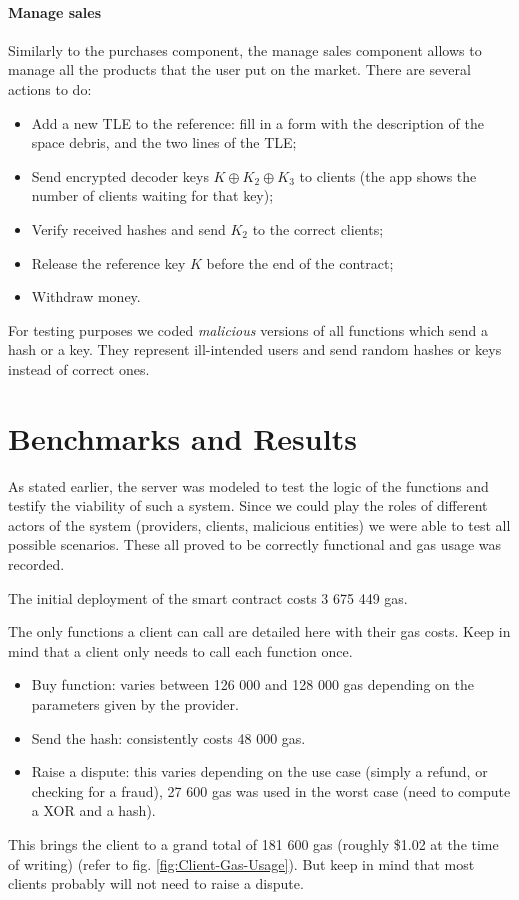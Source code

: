 \documentclass[conference]{IEEEtran}
\begin{document}
\paragraph{Manage sales}
Similarly to the purchases component, the manage sales component allows to manage all the products that the user put on the market. There are several actions to do:
 \begin{itemize}
    \item Add a new TLE to the reference: fill in a form with the description of the space debris, and the two lines of the TLE;
    \item Send encrypted decoder keys $K \oplus K_2 \oplus K_3$ to clients (the app shows the number of clients waiting for that key);
    \item Verify received hashes and send $K_2$ to the correct clients;
    \item Release the reference key $K$ before the end of the contract;
    \item Withdraw money.
\end{itemize}

For testing purposes we coded \textit{malicious} versions of all functions which send a hash or a key. They represent ill-intended users and send random hashes or keys instead of correct ones.

\section{Benchmarks and Results}{\label{Benchmarks}}

As stated earlier, the server was modeled to test the logic of the functions and testify the viability of such a system. Since we could play the roles of different actors of the system (providers, clients, malicious entities) we were able to test all possible scenarios. These all proved to be correctly functional and gas usage was recorded.

The initial deployment of the smart contract costs 3 675 449 gas.


The only functions a client can call are detailed here with their gas costs. Keep in mind that a client only needs to call each function once. 
\begin{itemize}
    \item Buy function: varies between 126 000 and 128 000 gas depending on the parameters given by the provider.
    \item Send the hash: consistently costs 48 000 gas.
    \item Raise a dispute: this varies depending on the use case (simply a refund, or checking for a fraud), 27 600 gas was used in the worst case (need to compute a XOR and a hash).
\end{itemize}
This brings the client to a grand total of 181 600 gas (roughly \$1.02 at the time of writing) (refer to fig. \ref{fig:Client-Gas-Usage}). But keep in mind that most clients probably will not need to raise a dispute.
\end{document}
